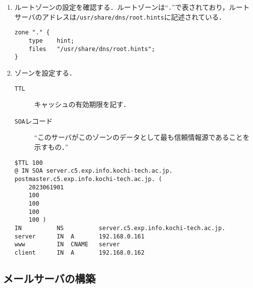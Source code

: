 \begin{enumerate}
    \item ルートゾーンの設定を確認する．ルートゾーンは``\texttt{.}''で表されており，ルートサーバのアドレスは\texttt{/usr/share/dns/root.hints}に記述されている．
          \begin{lstlisting}[caption={\ttfamily /etc/bind/named.conf.default-zones},style=file]
zone "." {
    type    hint;
    files   "/usr/share/dns/root.hints";
}
    \end{lstlisting}
    \item ゾーンを設定する．
          \begin{description}
              \item[\texttt{TTL}] キャッシュの有効期限を記す．
              \item[\texttt{SOA}レコード] ``このサーバがこのゾーンのデータとして最も信頼情報源であることを示すもの．''
          \end{description}
          \begin{lstlisting}[style=file,caption={\ttfamily /etc/bind/c5.zone}]
$TTL 100
@ IN SOA server.c5.exp.info.kochi-tech.ac.jp. postmaster.c5.exp.info.kochi-tech.ac.jp. (
    2023061901
    100
    100
    100
    100 )
IN          NS          server.c5.exp.info.kochi-tech.ac.jp.
server      IN  A       192.168.0.161
www         IN  CNAME   server
client      IN  A       192.168.0.162
    \end{lstlisting}

\end{enumerate}
\subsection{メールサーバの構築}